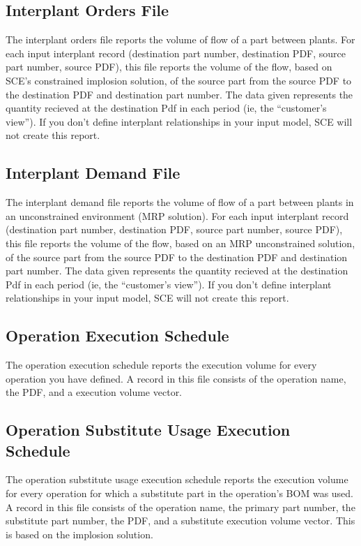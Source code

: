\subsection{Interplant Orders File}
The interplant orders file reports the volume of flow of a part
between plants.  For each input interplant record (destination part
number, destination PDF, source part number, source PDF), this file
reports the volume of the flow, based on SCE's constrained implosion
solution, of the source part from the source PDF to the destination
PDF and destination part number.  The data given represents the
quantity recieved at the destination Pdf in each period (ie, the
``customer's view'').
If you don't define interplant
relationships in your input model, SCE will not create this report.

\subsection{Interplant Demand File}
The interplant demand file reports the volume of flow of a part
between plants in an unconstrained environment (MRP solution).  For
each input interplant record (destination part number, destination
PDF, source part number, source PDF), this file reports the volume of
the flow, based on an MRP unconstrained solution, of the source part
from the source PDF to the destination PDF and destination part
number.   The data given represents the
quantity recieved at the destination Pdf in each period (ie, the
``customer's view'').
 If you don't define interplant relationships in your input
model, SCE will not create this report.

\subsection{Operation Execution Schedule}
The operation execution schedule reports the execution volume for
every operation you have defined.  A record in this file consists of
the operation name, the PDF, and a execution volume vector.

\subsection{Operation Substitute Usage Execution Schedule}
The operation substitute usage execution schedule reports the
execution volume for every operation for which a substitute part in
the operation's BOM was used. A record in this file consists of the
operation name, the primary part number, the substitute part number,
the PDF, and a substitute execution volume vector.  This is based on the
implosion solution.

